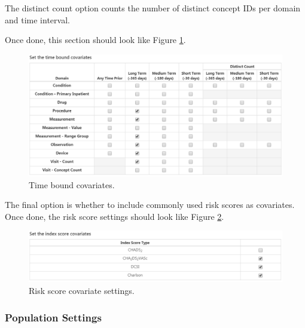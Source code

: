 \documentclass[11pt]{book}
\theoremstyle{definition}
\theoremstyle{definition}
\theoremstyle{definition}
\theoremstyle{remark}
\begin{document}
The distinct count option counts the number of distinct concept IDs per
domain and time interval.

Once done, this section should look like Figure
\ref{fig:covariateSettings5}.

\begin{figure}

{\centering \includegraphics[width=1\linewidth]{images/PatientLevelPrediction/covariateSettings5} 

}

\caption{Time bound covariates.}\label{fig:covariateSettings5}
\end{figure}

The final option is whether to include commonly used risk scores as
covariates. Once done, the risk score settings should look like Figure
\ref{fig:covariateSettings6}.

\begin{figure}

{\centering \includegraphics[width=1\linewidth]{images/PatientLevelPrediction/covariateSettings6} 

}

\caption{Risk score covariate settings.}\label{fig:covariateSettings6}
\end{figure}

\subsubsection*{Population Settings}\label{population-settings}
\end{document}
